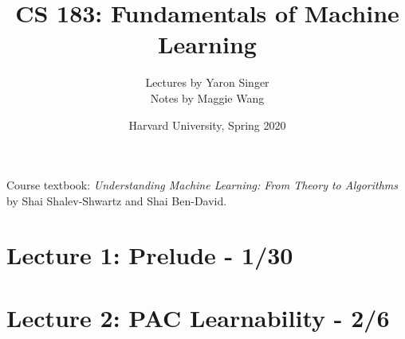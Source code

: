 \documentclass[8pt]{article}
\title{CS 183: Fundamentals of Machine Learning}
\author{Lectures by Yaron Singer \\
Notes by Maggie Wang}
\date{Harvard University, Spring 2020}
\begin{document}
\small

\maketitle

\noindent Course textbook: \textit{Understanding Machine Learning: From Theory to Algorithms} by Shai Shalev-Shwartz and Shai Ben-David.

\begin{multicols*}{2}
  \tableofcontents
\end{multicols*}

\newpage

\fancyhfoffset[E,O]{0pt}

\twocolumn

\section{Lecture 1: Prelude - 1/30}


\newpage

\section{Lecture 2: PAC Learnability - 2/6}

\end{document}
